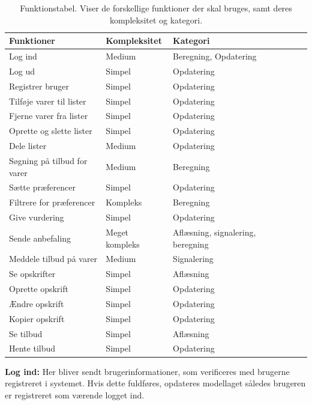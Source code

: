 \begin{table}[H]
  \centering
      \begin{tabular}{l|lllll}
      \textbf{Funktioner}			& {Kompleksitet}	& {Kategori}  	\\ \hline
      Log ind						& Medium			& Beregning, Opdatering		\\
      Log ud						& Simpel			& Opdatering	\\
      Registrer bruger				& Simpel			& Opdatering	\\
      Tilføje varer til lister		& Simpel       		& Opdatering	\\
      Fjerne varer fra lister		& Simpel       		& Opdatering	\\
      Oprette og slette lister		& Simpel       		& Opdatering	\\
      Dele lister					& Medium       		& Opdatering	\\
      Søgning på tilbud for varer   & Medium     		& Beregning		\\
      Sætte præferencer				& Simpel       		& Opdatering	\\
      Filtrere for præferencer		& Kompleks     		& Beregning		\\
      Give vurdering				& Simpel       		& Opdatering	\\
      Sende anbefaling				& Meget kompleks	& Aflæsning, signalering, beregning		\\
      Meddele tilbud på varer		& Medium      		& Signalering	\\
	    Se opskrifter					& Simpel       		& Aflæsning		\\
      Oprette opskrift      & Simpel          & Opdatering  \\
      Ændre opskrift        & Simpel          & Opdatering \\
      Kopier opskrift       & Simpel          & Opdatering \\
	    Se tilbud						& Simpel       		& Aflæsning		\\
      Hente tilbud					& Simpel	       	& Opdatering	\\
    \end{tabular}
  \caption{Funktionstabel. Viser de forskellige funktioner der skal bruges, samt deres kompleksitet og kategori.}\label{tabel:functionstable}
\end{table}

\textbf{Log ind:} Her bliver sendt brugerinformationer, som verificeres med brugerne registreret i systemet.
Hvis dette fuldføres, opdateres modellaget således brugeren er registreret som værende logget ind.

